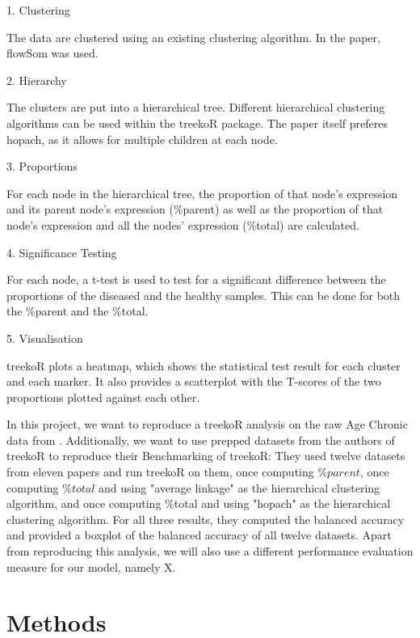 \documentclass[11pt,a4paper,twoside]{report}\usepackage[]{graphicx}\usepackage[]{color}
\begin{document}
1. Clustering

The data are clustered using an existing clustering algorithm. In the paper, flowSom was used. 

2. Hierarchy

The clusters are put into a hierarchical tree. Different hierarchical clustering algorithms can be used within the treekoR package. The paper itself preferes hopach, as it allows for multiple children at each node.

3. Proportions

For each node in the hierarchical tree, the proportion of that node's expression and its parent node's expression ($\%$parent) as well as the proportion of that node's expression and all the nodes' expression ($\%$total) are calculated.

4. Significance Testing

For each node, a t-test is used to test for a significant difference between the proportions of the diseased and the healthy samples. This can be done for both the $\%$parent and the $\%$total.

5. Visualisation

treekoR plots a heatmap, which shows the statistical test result for each cluster and each marker. It also provides a scatterplot with the T-scores of the two proportions plotted against each other.

In this project, we want to reproduce a treekoR analysis on the raw Age Chronic data from \citet{Shen:16}.
Additionally, we want to use prepped datasets from the authors of treekoR to reproduce their Benchmarking of treekoR: They used twelve datasets from eleven papers and run treekoR on them, once computing $\%parent$, once computing $\%total$ and using "average linkage" as the hierarchical clustering algorithm, and once computing $\%$total and using "hopach" as the hierarchical clustering algorithm. For all three results, they computed the balanced accuracy and provided a boxplot of the balanced accuracy of all twelve datasets. Apart from reproducing this analysis, we will also use a different performance evaluation measure for our model, namely X. 




\chapter{Methods} 
\end{document}
